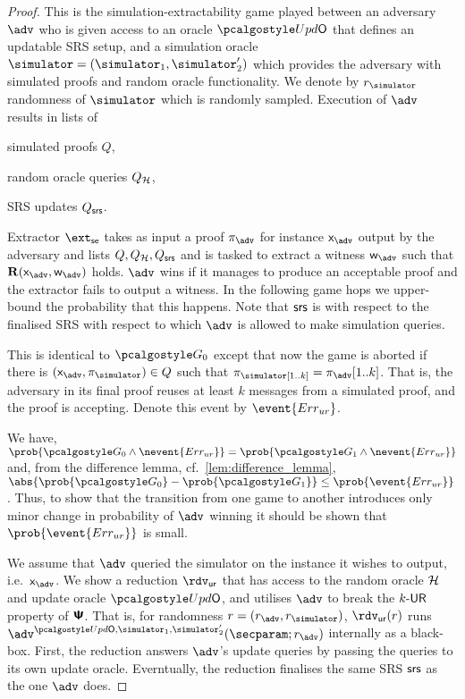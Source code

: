 	\begin{proof}
	 This is the simulation-extractability game played between an adversary
	$\advse$ who is given access to an oracle $\initU$ that defines an updatable SRS
	setup, and a simulation oracle $\simulator = (\simulator_1, \simulator_2')$ which provides the adversary with simulated
	proofs and random oracle functionality. We denote by $\rsim$
	randomness of $\simulator$ which is randomly sampled. Execution of $\advse$ results in
	lists of
	\begin{inparaenum}[(1)]
		\item simulated proofs $Q$,
		\item random oracle queries $Q_{\mathcal{H}}$,
		\item SRS updates $Q_{\mathsf{srs}}$.
	\end{inparaenum}
	Extractor $\extse$ takes as input a proof $\zkproof_{\advse}$ for instance
	$\inp_{\advse}$ output by the adversary and lists $Q, Q_{\mathcal{H}}, Q_{\mathsf{srs}}$ and is tasked
	to extract a witness $\wit_{\advse}$ such that $\REL(\inp_{\advse}, \wit_{\advse})$
	holds. $\advse$ wins if it manages to produce an acceptable proof and the extractor
	fails to output a witness. In the following game hops we upper-bound the
	probability that this happens. Note that $\mathsf{srs}$ is with respect to the finalised
	SRS with respect to which $\adv$ is allowed to make simulation queries.
	
	 This is identical to $\game{0}$ except that now the game is aborted if
	there is $(\inp_\advse, \zkproof_{\simulator}) \in Q$ such that
	$\zkproof_\simulator[1..k] = \zkproof_{\advse}[1..k]$. That is, the adversary in
	its final proof reuses at least $k$ messages from a simulated proof, and the proof
	is accepting.  Denote this event by $\event{\errur}$.

	 We have,
	\( \prob{\game{0} \land \nevent{\errur}} = \prob{\game{1} \land \nevent{\errur}} \)
	and, from the difference lemma, cf.~\cref{lem:difference_lemma},
	$ \abs{\prob{\game{0}} - \prob{\game{1}}} \leq \prob{\event{\errur}}\,$.  Thus, to
	show that the transition from one game to another introduces only minor change in
	probability of $\adv$ winning it should be shown that $\prob{\event{\errur}}$ is
	small.
	
	We assume that $\adv$ queried the simulator on the instance it wishes to
	output, i.e.~$\inp_{\adv}$. We show a reduction $\rdvur$ that has access to the random oracle $\mathcal{H}$ and update oracle $\initU$, and utilises $\adv$ to break the ${k\text{-}\mathsf{UR}}$ property of $\bm{\mathsf{\Psi}}$. That is, for randomness $r = (r_\adv, \rsim)$, $\rdvur (r)$ runs $\advse^{\initU, \simulator_1, \simulator_2'}(\secparam; r_\adv)$ internally as a black-box.
	First, the reduction answers $\adv$'s update queries by passing the queries to its own update oracle. Everntually, the reduction finalises the same SRS $\mathsf{srs}$ as the one $\adv$ does.
	

\end{proof}
